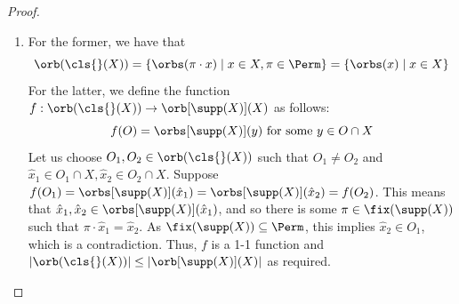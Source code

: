 \nomlemma*

\begin{proof}
	\begin{enumerate}
	\item For the former, we have that 
	$$\orb(\cls{}(X)) = \{\orbs(\pi\cdot x) \mid x \in X, \pi \in \Perm\} = \{\orbs(x) \mid x \in X\}$$
	For the latter, we define the function $f: \orb(\cls{}(X)) \to \orb[\supp(X)](X)$ as follows:
	\[
	f(O) = \orbs[\supp(X)](y) \text{ for some } y \in O \cap X
	\]
	Let us choose $O_1, O_2 \in \orb(\cls{}(X))$ such that $O_1 \neq O_2$ and $\hat x_1 \in O_1 \cap X, \hat x_2 \in O_2 \cap X$.
	Suppose $f(O_1) = \orbs[\supp(X)](\hat x_1) = \orbs[\supp(X)](\hat x_2) = f(O_2)$. 
	This means that $\hat x_1, \hat x_2 \in \orbs[\supp(X)](\hat x_1)$,
	and so there is some $\pi \in \fix(\supp(X))$ such that $\pi \cdot \hat x_1 = \hat x_2$. 
	As $\fix(\supp(X)) \subseteq \Perm$, this implies $\hat x_2 \in O_1$, which is a contradiction. 
	Thus, $f$ is a 1-1 function and $|\orb(\cls{}(X))| \le |\orb[\supp(X)](X)|$ as required.	
	

\end{enumerate}
\end{proof}
